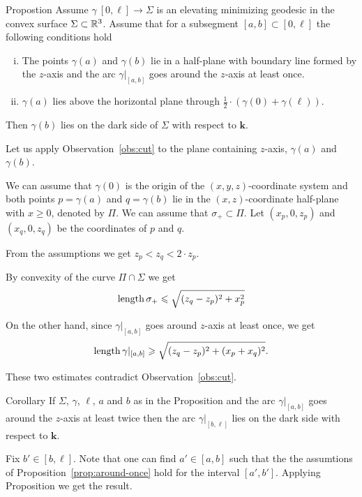 \documentclass[a4paper,10pt]{amsart}
\begin{document}
\begin{thm}{Propostion}\label{prop:around-once}
Assume $\gamma\:[0,\ell]\to \Sigma$ is an elevating minimizing geodesic in the convex surface $\Sigma\subset \mathbb{R}^3$.
Assume that for a subsegment $[a,b]\subset [0,\ell]$ the following conditions hold
\begin{enumerate}[(i)]
\item The points $\gamma(a)$ and $\gamma(b)$ lie in a half-plane with boundary line formed by the $z$-axis
and  the arc $\gamma|_{[a,b]}$ goes around the $z$-axis at least once.
\item $\gamma(a)$ lies above the horizontal plane through $\tfrac12\cdot(\gamma(0)+\gamma(\ell))$.
\end{enumerate}
Then  $\gamma(b)$ lies on the dark side of $\Sigma$ with respect to $\bm{k}$.
\end{thm}

Let us apply Observation~\ref{obs:cut} to the plane containing $z$-axis, $\gamma(a)$ and $\gamma(b)$.


We can assume that $\gamma(0)$ is the origin of the $(x,y,z)$-coordinate system
and both points $p=\gamma(a)$ and $q=\gamma(b)$ lie in the $(x,z)$-coordinate half-plane with $x\ge 0$, denoted by $\Pi$.
We can assume that $\sigma_+\subset \Pi$.
Let $(x_p,0,z_p)$ and $(x_q,0,z_q)$ be the coordinates of $p$ and $q$.

From the assumptions we get $z_p<z_q<2\cdot z_p$.

By convexity of the curve $\Pi\cap \Sigma$
we get 
\[\mathop{\rm length}\nolimits\sigma_+\leqslant \sqrt{(z_q-z_p)^2+x_p^2}\]

On the other hand, since $\gamma|_{[a,b]}$ goes around $z$-axis at least once,
we get 
\[\mathop{\rm length}\nolimits\gamma|_{[a,b]}\geqslant \sqrt{(z_q-z_p)^2+(x_p+x_q)^2}.\]

These two estimates contradict Observation~\ref{obs:cut}.
\qeds

\begin{thm}{Corollary}\label{cor:around-twice}
If $\Sigma$, $\gamma$, $\ell$, $a$ and $b$ as in the Proposition and the arc $\gamma|_{[a,b]}$ goes around the $z$-axis at least twice
then the arc $\gamma|_{[b,\ell]}$ lies on the dark side with respect to $\bm{k}$.
\end{thm}

Fix $b'\in [b,\ell]$.
Note that one can find $a'\in [a,b]$ such that the the assumtions of Proposition~\ref{prop:around-once} hold for the interval $[a',b']$. Applying Proposition we get the result.\qeds 
\end{document}
